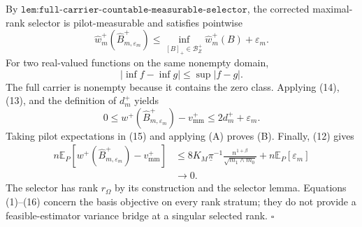 By \(\texttt{lem:full-carrier-countable-measurable-selector}\), the corrected maximal-rank selector is pilot-measurable and satisfies pointwise
\[
\widehat w_m^+(\widehat B_{m,\varepsilon_m}^+)
\le\inf_{[B]_+\in\mathcal B_Z^+}\widehat w_m^+(B)+\varepsilon_m.
\tag{13}
\]
For two real-valued functions on the same nonempty domain,
\[
|\inf f-\inf g|\le\sup|f-g|.
\tag{14}
\]
The full carrier is nonempty because it contains the zero class.  Applying (14), (13), and the definition of \(d_m^+\) yields
\[
0\le w^+(\widehat B_{m,\varepsilon_m}^+)-v_{\mathrm{mm}}^+
\le2d_m^++\varepsilon_m.
\tag{15}
\]
Taking pilot expectations in (15) and applying (A) proves (B).  Finally, (12) gives
\[
\begin{aligned}
n\mathbb E_P\!\left[
w^+(\widehat B_{m,\varepsilon_m}^+)-v_{\mathrm{mm}}^+
\right]
&\le8K_M\underline\pi^{-1}
\frac{n^{1+\beta}}{\sqrt{m_1\wedge m_0}}
+n\mathbb E_P[\varepsilon_m]\\
&\longrightarrow0.
\end{aligned}
\tag{16}
\]
The selector has rank \(r_\Omega\) by its construction and the selector lemma.  Equations (1)--(16) concern the basis objective on every rank stratum; they do not provide a feasible-estimator variance bridge at a singular selected rank. \(\square\)